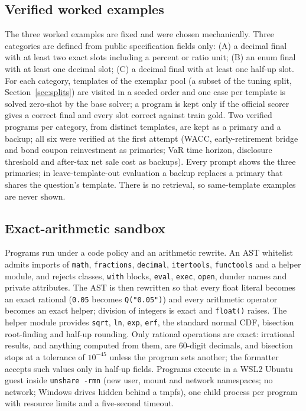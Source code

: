 \documentclass[conference]{IEEEtran}
\newcommand{\id}[1]{\texttt{#1}}
\begin{document}
\subsection{Verified worked examples}\label{sec:exemplars}
The three worked examples are fixed and were chosen mechanically. Three categories are defined from public specification fields only: (A) a decimal final with at least two exact slots including a percent or ratio unit; (B) an enum final with at least one decimal slot; (C) a decimal final with at least one half-up slot. For each category, templates of the exemplar pool (a subset of the tuning split, Section~\ref{sec:splits}) are visited in a seeded order and one case per template is solved zero-shot by the base solver; a program is kept only if the official scorer gives a correct final and every slot correct against train gold. Two verified programs per category, from distinct templates, are kept as a primary and a backup; all six were verified at the first attempt (WACC, early-retirement bridge and bond coupon reinvestment as primaries; VaR time horizon, disclosure threshold and after-tax net sale cost as backups). Every prompt shows the three primaries; in leave-template-out evaluation a backup replaces a primary that shares the question's template. There is no retrieval, so same-template examples are never shown.

\subsection{Exact-arithmetic sandbox}\label{sec:sandbox}
Programs run under a code policy and an arithmetic rewrite. An AST whitelist admits imports of \id{math}, \id{fractions}, \id{decimal}, \id{itertools}, \id{functools} and a helper module, and rejects classes, \id{with} blocks, \id{eval}, \id{exec}, \id{open}, dunder names and private attributes. The AST is then rewritten so that every float literal becomes an exact rational (\id{0.05} becomes \id{Q("0.05")}) and every arithmetic operator becomes an exact helper; division of integers is exact and \id{float()} raises. The helper module provides \id{sqrt}, \id{ln}, \id{exp}, \id{erf}, the standard normal CDF, bisection root-finding and half-up rounding. Only rational operations are exact: irrational results, and anything computed from them, are 60-digit decimals, and bisection stops at a tolerance of $10^{-45}$ unless the program sets another; the formatter accepts such values only in half-up fields. Programs execute in a WSL2 Ubuntu guest inside \id{unshare -rmn} (new user, mount and network namespaces; no network; Windows drives hidden behind a tmpfs), one child process per program with resource limits and a five-second timeout.
\end{document}
